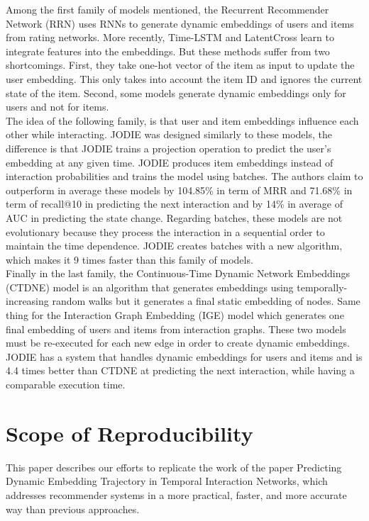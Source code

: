 Among the first family of models mentioned, the Recurrent Recommender Network\supercite{10.1145/3018661.3018689} (RRN) uses RNNs to generate dynamic embeddings of users and items from rating networks. More recently, Time-LSTM\supercite{ijcai2017-504} and LatentCross\supercite{46488} learn to integrate features into the embeddings. But these methods suffer from two shortcomings. First, they take one-hot vector of the item as input to update the user embedding. This only takes into account the item ID and ignores the current state of the item. Second, some models generate dynamic embeddings only for users and not for items.\\

The idea of the following family, is that user and item embeddings influence each other while interacting. JODIE was designed similarly to these models, the difference is that JODIE trains a projection operation to predict the user's embedding at any given time. JODIE produces item embeddings instead of interaction probabilities and trains the model using batches. The authors claim to outperform in average these models by 104.85\% in term of MRR and 71.68\% in term of recall@10 in predicting the next interaction and by 14\% in average of AUC in predicting the state change. Regarding batches, these models are not evolutionary because they process the interaction in a sequential order to maintain the time dependence. JODIE creates batches with a new algorithm, which makes it 9 times faster than this family of models.\\

Finally in the last family, the Continuous-Time Dynamic Network Embeddings\supercite{CTDNE} (CTDNE) model is an algorithm that generates embeddings using temporally-increasing random walks but it generates a final static embedding of nodes. Same thing for the Interaction Graph Embedding\supercite{IGE} (IGE) model which generates one final embedding of users and items from interaction graphs. These two models must be re-executed for each new edge in order to create dynamic embeddings. JODIE has a system that handles dynamic embeddings for users and items and is 4.4 times better than CTDNE at predicting the next interaction, while having a comparable execution time.
\fi

\section*{Scope of Reproducibility}

This paper describes our efforts to replicate the work of the paper Predicting Dynamic Embedding Trajectory in Temporal Interaction Networks\supercite{kumar2019predicting}, which addresses recommender systems in a more practical, faster, and more accurate way than previous approaches.\\


